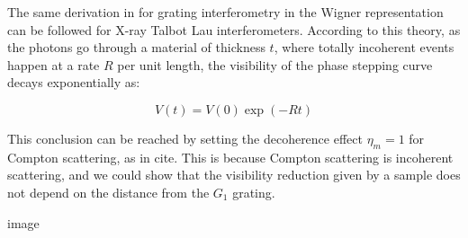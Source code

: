 The same derivation in \cite{Hornberger_2004} for grating interferometry in the Wigner representation can be followed for X-ray Talbot Lau interferometers. According to this theory, as the photons go through a material of thickness $t$, where totally incoherent events happen at a rate $R$ per unit length, the visibility of the phase stepping curve decays exponentially as:

\begin{equation}
V(t) = V(0)\exp(-Rt)
\end{equation}

This conclusion can be reached by setting the decoherence effect $\eta_m = 1$ 
for Compton scattering, as in cite. This is because Compton scattering is
incoherent scattering, and we could show that the visibility reduction given
by a sample does not depend on the distance from the $G_1$ grating.

image
